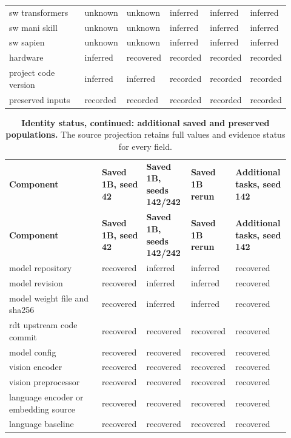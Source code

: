 \begin{longtable}{p{0.290\linewidth} p{0.120\linewidth} p{0.120\linewidth} p{0.130\linewidth} p{0.130\linewidth} p{0.130\linewidth}}
sw transformers & unknown & unknown & inferred & inferred & inferred \\
sw mani skill & unknown & unknown & inferred & inferred & inferred \\
sw sapien & unknown & unknown & inferred & inferred & inferred \\
hardware & inferred & recovered & recorded & recorded & recorded \\
project code version & inferred & inferred & recorded & recorded & recorded \\
preserved inputs & recorded & recorded & recorded & recorded & recorded \\
\end{longtable}

\setlength{\tabcolsep}{2pt}
\begin{longtable}{p{0.320\linewidth} p{0.150\linewidth} p{0.150\linewidth} p{0.150\linewidth} p{0.150\linewidth}}
\noalign{\addtocounter{table}{-1}}
\caption*{\textbf{Identity status, continued: additional saved and preserved populations.} The source projection retains full values and evidence status for every field.}\\
\toprule
\textbf{Component} & \textbf{Saved 1B, seed 42} & \textbf{Saved 1B, seeds 142/242} & \textbf{Saved 1B rerun} & \textbf{Additional tasks, seed 142} \\
\midrule\endfirsthead
\toprule
\textbf{Component} & \textbf{Saved 1B, seed 42} & \textbf{Saved 1B, seeds 142/242} & \textbf{Saved 1B rerun} & \textbf{Additional tasks, seed 142} \\
\midrule\endhead
\bottomrule\endfoot
model repository & recovered & inferred & inferred & recovered \\
model revision & recovered & inferred & inferred & recovered \\
model weight file and sha256 & recovered & inferred & inferred & recovered \\
rdt upstream code commit & recovered & recovered & recovered & recovered \\
model config & recovered & recovered & recovered & recovered \\
vision encoder & recovered & recovered & recovered & recovered \\
vision preprocessor & recovered & recovered & recovered & recovered \\
language encoder or embedding source & recovered & recovered & recovered & recovered \\
language baseline & recovered & recovered & recovered & recovered \\

\end{longtable}
